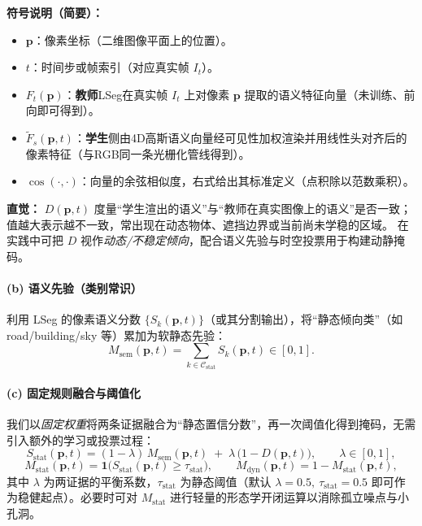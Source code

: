 \documentclass[10pt,conference]{IEEEtran} %
\begin{document}
\noindent\textbf{符号说明（简要）：}
\begin{itemize}
  \item $\mathbf p$：像素坐标（二维图像平面上的位置）。
  \item $t$：时间步或帧索引（对应真实帧 $I_t$）。
  \item $F_t(\mathbf p)$：\textbf{教师}LSeg在真实帧 $I_t$ 上对像素 $\mathbf p$ 提取的语义特征向量（未训练、前向即可得到）。
  \item $\tilde F_s(\mathbf p,t)$：\textbf{学生}侧由4D高斯语义向量经可见性加权渲染并用线性头对齐后的像素特征（与RGB同一条光栅化管线得到）。
  \item $\cos(\cdot,\cdot)$：向量的余弦相似度，右式给出其标准定义（点积除以范数乘积）。
\end{itemize}

\noindent\textbf{直觉：}
$D(\mathbf p,t)$ 度量“学生渲出的语义”与“教师在真实图像上的语义”是否一致；
值越大表示越不一致，常出现在动态物体、遮挡边界或当前尚未学稳的区域。
在实践中可把 $D$ 视作\emph{动态/不稳定倾向}，配合语义先验与时空投票用于构建动静掩码。



\paragraph{(b) 语义先验（类别常识）}
利用 LSeg 的像素语义分数 $\{S_k(\mathbf p,t)\}$（或其分割输出），将“静态倾向类”（如 road/building/sky 等）累加为软静态先验：
\begin{equation}
M_{\mathrm{sem}}(\mathbf p,t)=\sum_{k\in\mathcal C_{\mathrm{stat}}}S_k(\mathbf p,t)\in[0,1].
\label{eq:demm_sem_final}
\end{equation}

\paragraph{(c) 固定规则融合与阈值化}
我们以\emph{固定权重}将两条证据融合为“静态置信分数”，再一次阈值化得到掩码，无需引入额外的学习或投票过程：
\begin{equation}
S_{\mathrm{stat}}(\mathbf p,t)= (1-\lambda)\,M_{\mathrm{sem}}(\mathbf p,t)\;+\;\lambda\,\bigl(1-D(\mathbf p,t)\bigr),\qquad \lambda\in[0,1],
\label{eq:demm_fuse_score_final}
\end{equation}
\begin{equation}
M_{\mathrm{stat}}(\mathbf p,t)=\mathbf 1\!\bigl(S_{\mathrm{stat}}(\mathbf p,t)\ge \tau_{\mathrm{stat}}\bigr),\qquad
M_{\mathrm{dyn}}(\mathbf p,t)=1-M_{\mathrm{stat}}(\mathbf p,t),
\label{eq:demm_mask_final}
\end{equation}
其中 $\lambda$ 为两证据的平衡系数，$\tau_{\mathrm{stat}}$ 为静态阈值（默认 $\lambda{=}0.5,\ \tau_{\mathrm{stat}}{=}0.5$ 即可作为稳健起点）。必要时可对 $M_{\mathrm{stat}}$ 进行轻量的形态学开闭运算以消除孤立噪点与小孔洞。
\end{document}
